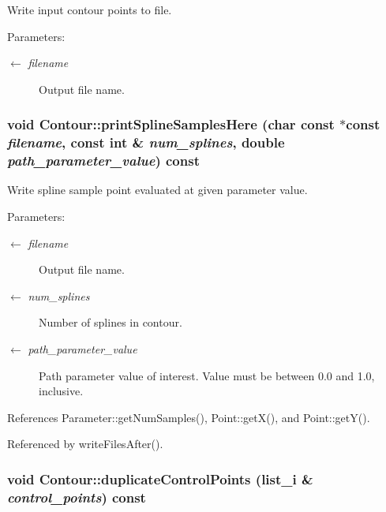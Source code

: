 Write input contour points to file. \begin{Desc}
\item[Parameters:]
\begin{description}
\item[\mbox{$\leftarrow$} {\em filename}]Output file name. \end{description}
\end{Desc}
\hypertarget{classContour_99c3b3f32aeeabcf65dad7ba65e667cf}{
\subsubsection[printSplineSamplesHere]{\setlength{\rightskip}{0pt plus 5cm}void Contour::printSplineSamplesHere (char const $\ast$const  {\em filename}, \/  const int \& {\em num\_\-splines}, \/  double {\em path\_\-parameter\_\-value}) const}}
\label{classContour_99c3b3f32aeeabcf65dad7ba65e667cf}


Write spline sample point evaluated at given parameter value. \begin{Desc}
\item[Parameters:]
\begin{description}
\item[\mbox{$\leftarrow$} {\em filename}]Output file name. \item[\mbox{$\leftarrow$} {\em num\_\-splines}]Number of splines in contour. \item[\mbox{$\leftarrow$} {\em path\_\-parameter\_\-value}]Path parameter value of interest. Value must be between 0.0 and 1.0, inclusive. \end{description}
\end{Desc}


References Parameter::getNumSamples(), Point::getX(), and Point::getY().

Referenced by writeFilesAfter().\hypertarget{classContour_6d939fbc0872756248ff958d447b74af}{
\subsubsection[duplicateControlPoints]{\setlength{\rightskip}{0pt plus 5cm}void Contour::duplicateControlPoints ({\bf list\_\-i} \& {\em control\_\-points}) const}}
\label{classContour_6d939fbc0872756248ff958d447b74af}


